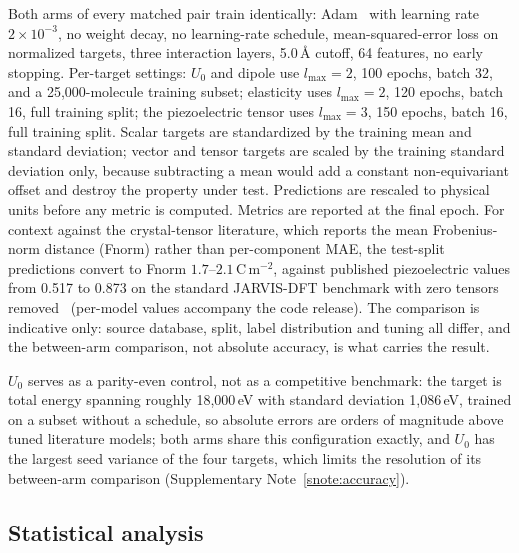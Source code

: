 Both arms of every matched pair train identically: Adam~\cite{kingma2015adam} with learning rate $2\times10^{-3}$, no weight decay, no learning-rate schedule, mean-squared-error loss on normalized targets, three interaction layers, 5.0\,\AA{} cutoff, 64 features, no early stopping. Per-target settings: $U_0$ and dipole use $l_{\max}=2$, 100 epochs, batch 32, and a 25,000-molecule training subset; elasticity uses $l_{\max}=2$, 120 epochs, batch 16, full training split; the piezoelectric tensor uses $l_{\max}=3$, 150 epochs, batch 16, full training split. Scalar targets are standardized by the training mean and standard deviation; vector and tensor targets are scaled by the training standard deviation only, because subtracting a mean would add a constant non-equivariant offset and destroy the property under test. Predictions are rescaled to physical units before any metric is computed. Metrics are reported at the final epoch. For context against the crystal-tensor literature, which reports the mean Frobenius-norm distance (Fnorm) rather than per-component MAE, the test-split predictions convert to Fnorm $1.7$--$2.1$\,C\,m$^{-2}$, against published piezoelectric values from 0.517 to 0.873 on the standard JARVIS-DFT benchmark with zero tensors removed~\cite{zhong2022edge} (per-model values accompany the code release). The comparison is indicative only: source database, split, label distribution and tuning all differ, and the between-arm comparison, not absolute accuracy, is what carries the result.

$U_0$ serves as a parity-even control, not as a competitive benchmark: the target is total energy spanning roughly 18,000\,eV with standard deviation 1,086\,eV, trained on a subset without a schedule, so absolute errors are orders of magnitude above tuned literature models; both arms share this configuration exactly, and $U_0$ has the largest seed variance of the four targets, which limits the resolution of its between-arm comparison (Supplementary Note~\ref{snote:accuracy}).

\subsection*{Statistical analysis}


